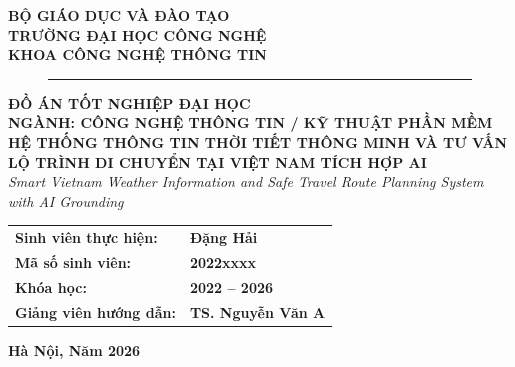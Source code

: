 \begin{titlepage}

\centering
\vspace*{-5mm}
{\fontsize{14pt}{16pt}\selectfont \textbf{BỘ GIÁO DỤC VÀ ĐÀO TẠO}}\\[3mm]
{\fontsize{15pt}{18pt}\selectfont \textbf{TRƯỜNG ĐẠI HỌC CÔNG NGHỆ}}\\[2mm]
{\fontsize{13pt}{15pt}\selectfont \textbf{KHOA CÔNG NGHỆ THÔNG TIN}}\\[12mm]

\begin{figure}[h!]
\centering
\vspace{5mm}
\rule{35mm}{35mm}
\vspace{5mm}
\end{figure}

\vspace{10mm}
{\fontsize{18pt}{22pt}\selectfont \textbf{ĐỒ ÁN TỐT NGHIỆP ĐẠI HỌC}}\\[6mm]
{\fontsize{14pt}{16pt}\selectfont \textbf{NGÀNH: CÔNG NGHỆ THÔNG TIN / KỸ THUẬT PHẦN MỀM}}\\[12mm]

{\fontsize{18pt}{24pt}\selectfont \textbf{HỆ THỐNG THÔNG TIN THỜI TIẾT THÔNG MINH VÀ TƯ VẤN LỘ TRÌNH DI CHUYỂN TẠI VIỆT NAM TÍCH HỢP AI}}\\[4mm]
{\fontsize{13pt}{16pt}\selectfont \textit{Smart Vietnam Weather Information and Safe Travel Route Planning System with AI Grounding}}\\[25mm]

\begin{flushleft}
\hspace{25mm}
\begin{tabular}{ll}
\textbf{Sinh viên thực hiện:} & \textbf{Đặng Hải} \\
\textbf{Mã số sinh viên:}     & \textbf{2022xxxx} \\
\textbf{Khóa học:}            & \textbf{2022 -- 2026} \\
\textbf{Giảng viên hướng dẫn:}& \textbf{TS. Nguyễn Văn A} \\
\end{tabular}
\end{flushleft}

\vfill
{\fontsize{13pt}{15pt}\selectfont \textbf{Hà Nội, Năm 2026}}\\[5mm]
\end{titlepage}
